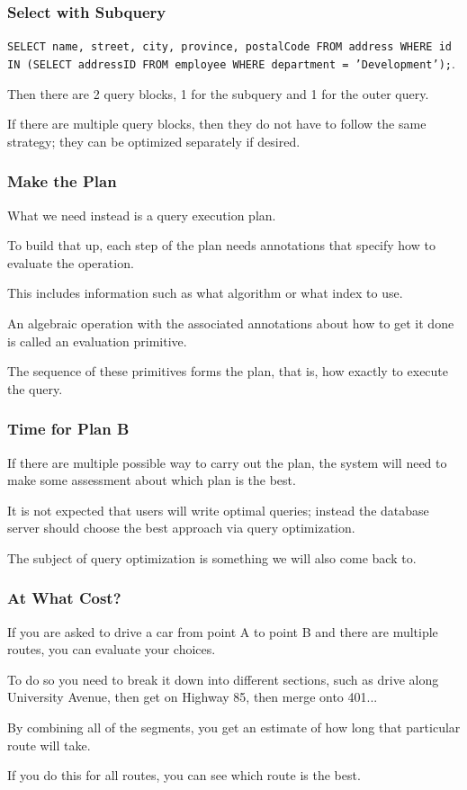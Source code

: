 \begin{frame}
\frametitle{Select with Subquery}

\texttt{SELECT name, street, city, province, postalCode FROM address WHERE id IN (SELECT addressID FROM employee WHERE department = 'Development');}. 

Then there are 2 query blocks, 1 for the subquery and 1 for the outer query. 

If there are multiple query blocks, then they do not have to follow the same strategy; they can be optimized separately if desired. 

\end{frame}


\begin{frame}
\frametitle{Make the Plan}


What we need instead is a \alert{query execution plan}.

To build that up, each step of the plan needs annotations that specify how to evaluate the operation. 

This includes information such as what algorithm or what index to use. 

An algebraic operation with the associated annotations about how to get it done is called an \alert{evaluation primitive}. 

The sequence of these primitives forms the plan, that is, how exactly to execute the query.

\end{frame}

\begin{frame}
\frametitle{Time for Plan B}

If there are multiple possible way to carry out the plan, the system will need to make some assessment about which plan is the best. 

It is not expected that users will write optimal queries; instead the database server should choose the best approach via \alert{query optimization}. 

 The subject of query optimization is something we will also come back to.

\end{frame}

\begin{frame}
\frametitle{At What Cost?}

If you are asked to drive a car from point A to point B and there are multiple routes, you can evaluate your choices. 

To do so you need to break it down into different sections, such as drive along University Avenue, then get on Highway 85, then merge onto 401... 

By combining all of the segments, you get an estimate of how long that particular route will take. 

If you do this for all routes, you can see which route is the best. 

\end{frame}

